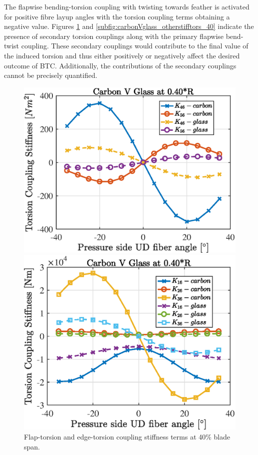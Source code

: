 \documentclass[a4paper]{jpconf}
\begin{document}
The flapwise bending-torsion coupling with twisting towards feather is activated for positive fibre layup angles with the torsion coupling terms obtaining a negative value. Figures \ref{subfig:carbonVglass_flapvedgetors_40} and \ref{subfig:carbonVglass_otherstifftors_40} indicate the presence of secondary torsion couplings along with the primary flapwise bend-twist coupling. These secondary couplings would contribute to the final value of the induced torsion and thus either positively or negatively affect the desired outcome of BTC. Additionally, the contributions of the secondary couplings cannot be precisely quantified.      
\begin{figure}[pth]
\centering
\begin{minipage}{0.35\textwidth}
\includegraphics[width=\linewidth]{Figures/Chapter4/Stiffness/CarbonVglass_flapVedgecoupl_40_eps.eps}
\caption{\label{subfig:carbonVglass_flapvedgetors_40}Flap-torsion and edge-torsion coupling stiffness terms at 40\% blade span.}
\end{minipage}\hspace{0.10\textwidth}%
\begin{minipage}{0.35\textwidth}
\includegraphics[width=\linewidth]{Figures/Chapter4/Stiffness/CarbonVglass_otherstiffcoupl_40_eps.eps}

\end{minipage}
\end{figure}
\end{document}
